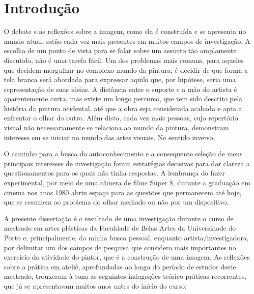 \chapter*{Introdução}\label{introducao}
\pagestyle{introducao}

O debate e as reflexões sobre a imagem, como ela é construída e se
apresenta no mundo atual, estão cada vez mais presentes em muitos
campos de investigação. A escolha de um ponto de vista para se falar
sobre um assunto tão amplamente discutido, não é uma tarefa fácil. Um
dos problemas mais comuns, para aqueles que decidem mergulhar no
complexo mundo da pintura, é decidir de que forma a tela branca será
abordada para expressar aquilo que, por hipótese, seria uma
representação de suas ideias. A distância entre o suporte e a mão do
artista é aparentemente curta, mas existe um longo percurso, que tem
sido descrito pela história da pintura ocidental, até que a obra seja
considerada acabada e apta a enfrentar o olhar do outro. Além disto,
cada vez mais pessoas, cujo repertório visual não necessariamente se
relaciona ao mundo da pintura, demonstram interesse em se iniciar no
mundo das artes visuais. No sentido inverso,

O caminho para a busca do autoconhecimento e a consequente seleção de
meus principais interesses de investigação foram estratégias decisivas
para dar clareza a questionamentos para os quais não tinha respostas. A
lembrança do fazer experimental, por meio de uma câmera de filme Super
8, durante a graduação em cinema nos anos 1980 abriu espaço para as
questões que permanecem até hoje, que se resumem ao problema do olhar
mediado ou não por um dispositivo.

A presente dissertação é o resultado de uma investigação durante o
curso de mestrado em artes plásticas da Faculdade de Belas Artes da
Universidade do Porto e, principalmente, da minha busca pessoal,
enquanto artista/investigadora, por delimitar um dos campos de pesquisa
que considero mais importantes no exercício da atividade do pintor, que
é a construção de uma imagem. As reflexões sobre a prática em ateliê,
aprofundadas ao longo do período de estudos deste mestrado, trouxeram à
tona as seguintes indagações teórico-práticas recorrentes, que já se
apresentavam muitos anos antes do início do curso:

